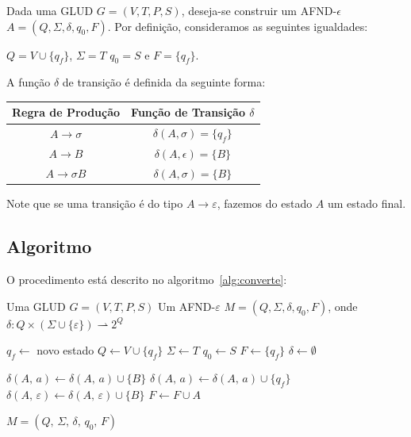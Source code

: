 \documentclass[12pt, a4paper]{article}
\theoremstyle{definition}
\theoremstyle{plain}
\theoremstyle{remark}
\begin{document}
Dada uma GLUD $G = (V, T, P, S)$, deseja-se construir um AFND-$\epsilon$ $A = (Q, \Sigma, \delta, q_{0}, F)$. Por definição, consideramos as seguintes igualdades:
\begin{center}
    $Q = V \cup \{q_f\}$, $\Sigma = T$ $q_{0} = S$ e $F = \{q_f\}$.
\end{center}
A função $\delta$ de transição é definida da seguinte forma: \\
\begin{center}
\begin{tabular}{c|c}
  \textbf{Regra de Produção} & \textbf{Função de Transição $\delta$} \\\hline  
  $A \rightarrow \sigma$ & $\delta(A, \sigma) = \{q_f\}$ \\
  $A \rightarrow B$ & $\delta(A, \epsilon) = \{B\}$ \\
  $A \rightarrow \sigma B$ & $\delta(A, \sigma) = \{B\}$ \\
\end{tabular}
\end{center}

Note que se uma transição é do tipo $A \rightarrow \varepsilon$, fazemos do estado $A$ um estado final. 

\subsection{Algoritmo}
O procedimento está descrito no algoritmo~\ref{alg:converte}:

\begin{algorithm}[H]
  \caption{$\textsc{Converte}(G)$}
  \label{alg:converte}
  \begin{algorithmic}[1]
    \Require Uma GLUD $G = (V, T, P, S)$
    \Ensure Um AFND-$\varepsilon$ $M = (Q, \Sigma, \delta, q_0, F)$,
             onde $\delta : Q \times (\Sigma \cup \{\varepsilon\}) \rightharpoonup 2^Q$

    \State $q_f \leftarrow$ novo estado
    \State $Q \leftarrow V \cup \{q_f\}$
    \State $\Sigma \leftarrow T$
    \State $q_0 \leftarrow S$
    \State $F \leftarrow \{q_f\}$
    \State $\delta \leftarrow \emptyset$

        \State $\delta(A,\, a) \leftarrow \delta(A,\, a) \cup \{B\}$
        \State $\delta(A,\, a) \leftarrow \delta(A,\, a) \cup \{q_f\}$
        \State $\delta(A,\, \varepsilon) \leftarrow \delta(A,\, \varepsilon) \cup \{B\}$
        \State $F \gets F \cup {A}$
      \EndIf
    \EndFor

    \State \Return $M = (Q,\, \Sigma,\, \delta,\, q_0,\, F)$
  \end{algorithmic}
\end{algorithm}
\end{document}
